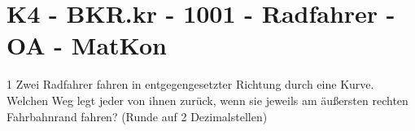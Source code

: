 \section{K4 - BKR.kr - 1001 - Radfahrer - OA - MatKon}

\begin{langesbeispiel} \item[1] %
Zwei Radfahrer fahren in entgegengesetzter Richtung durch eine Kurve. Welchen Weg legt jeder von ihnen zurück, wenn sie jeweils am äußersten rechten Fahrbahnrand fahren? (Runde auf 2 Dezimalstellen)
				\begin{center}
				\end{center}
				
\end{langesbeispiel}